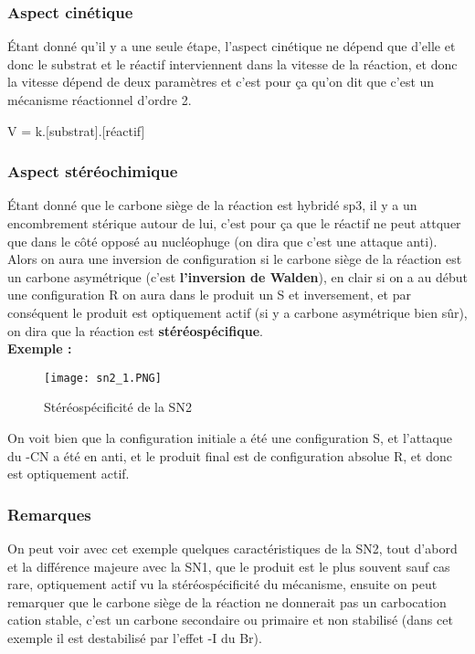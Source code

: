 \documentclass[a4paper, oneside]{book}
\begin{document}
\subsubsection{Aspect cinétique}
\'Etant donné qu'il y a une seule étape, l'aspect cinétique ne dépend que d'elle et donc le substrat et le réactif interviennent dans la vitesse de la réaction, et donc la vitesse dépend de deux paramètres et c'est pour ça qu'on dit que c'est un mécanisme réactionnel d'ordre 2.
\begin{center}
    V = k.[substrat].[réactif]
\end{center}
\subsubsection{Aspect stéréochimique}
\'Etant donné que le carbone siège de la réaction est hybridé sp3, il y a un encombrement stérique autour de lui, c'est pour ça que le réactif ne peut attquer que dans le côté opposé au nucléophuge (on dira que c'est une attaque anti). Alors on aura une inversion de configuration si le carbone siège de la réaction est un carbone asymétrique (c'est \textbf{l'inversion de Walden}), en clair si on a au début une configuration R on aura dans le produit un S et inversement, et par conséquent le produit est optiquement actif (si y a carbone asymétrique bien sûr), on dira que la réaction est \textbf{stéréospécifique}.\\
\textbf{Exemple :}
\begin{figure}[!h]
    \centering
    \texttt{[image: sn2\_1.PNG]}
    \caption{Stéréospécificité de la SN2}
    \label{fig:my_label}
\end{figure}
\newline
On voit bien que la configuration initiale a été une configuration S, et l'attaque du -CN a été en anti, et le produit final est de configuration absolue R, et donc est optiquement actif. 
\subsubsection{Remarques}
On peut voir avec cet exemple quelques caractéristiques de la SN2, tout d'abord et la différence majeure avec la SN1, que le produit est le plus souvent sauf cas rare, optiquement actif vu la stéréospécificité du mécanisme, ensuite on peut remarquer que le carbone siège de la réaction ne donnerait pas un carbocation cation stable, c'est un carbone secondaire ou primaire et non stabilisé (dans cet exemple il est destabilisé par l'effet -I du Br). 
\end{document}
